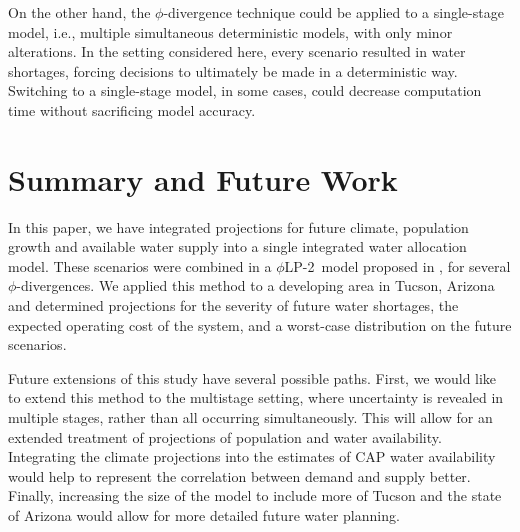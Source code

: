 \documentclass[11pt]{article}
\theoremstyle{plain}
\theoremstyle{definition}
\theoremstyle{remark}
\newcommand{\plp}{$\phi$LP-2}
\begin{document}
On the other hand, the $\phi$-divergence technique could be applied to a single-stage model, i.e., multiple simultaneous deterministic models, with only minor alterations.
In the setting considered here, every scenario resulted in water shortages, forcing decisions to ultimately be made in a deterministic way.
Switching to a single-stage model, in some cases, could decrease computation time without sacrificing model accuracy.



\section{Summary and Future Work}
\label{sec:concl_water}

In this paper, we have integrated projections for future climate, population growth and available water supply into a single integrated water allocation model.
These scenarios were combined in a \plp\ model proposed in \citep{love2013phi}, for several $\phi$-divergences.
We applied this method to a developing area in Tucson, Arizona and determined projections for the severity of future water shortages, the expected operating cost of the system, and a worst-case distribution on the future scenarios.

Future extensions of this study have several possible paths.
First, we would like to extend this method to the multistage setting, where uncertainty is revealed in multiple stages, rather than all occurring simultaneously.
This will allow for an extended treatment of projections of population and water availability.
Integrating the climate projections into the estimates of CAP water availability would help to represent the correlation between demand and supply better.
Finally, increasing the size of the model to include more of Tucson and the state of Arizona would allow for more detailed future water planning.




%
\end{document}
